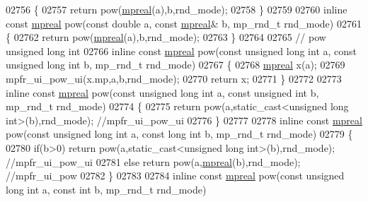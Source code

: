 \begin{DoxyCode}
{{02756 \{
02757     \textcolor{keywordflow}{return} pow(\hyperlink{classmpfr_1_1mpreal}{mpreal}(a),b,rnd\_mode);
02758 \}
02759 
02760 \textcolor{keyword}{inline} \textcolor{keyword}{const} \hyperlink{classmpfr_1_1mpreal}{mpreal} pow(\textcolor{keyword}{const} \textcolor{keywordtype}{double} a, \textcolor{keyword}{const} \hyperlink{classmpfr_1_1mpreal}{mpreal}& b, mp\_rnd\_t rnd\_mode)
02761 \{
02762     \textcolor{keywordflow}{return} pow(\hyperlink{classmpfr_1_1mpreal}{mpreal}(a),b,rnd\_mode);
02763 \}
02764 
02765 \textcolor{comment}{// pow unsigned long int}
02766 \textcolor{keyword}{inline} \textcolor{keyword}{const} \hyperlink{classmpfr_1_1mpreal}{mpreal} pow(\textcolor{keyword}{const} \textcolor{keywordtype}{unsigned} \textcolor{keywordtype}{long} \textcolor{keywordtype}{int} a, \textcolor{keyword}{const} \textcolor{keywordtype}{unsigned} \textcolor{keywordtype}{long} \textcolor{keywordtype}{int} b, mp\_rnd\_t rnd\_mode)
02767 \{
02768     \hyperlink{classmpfr_1_1mpreal}{mpreal} x(a);
02769     mpfr\_ui\_pow\_ui(x.mp,a,b,rnd\_mode);
02770     \textcolor{keywordflow}{return} x;
02771 \}
02772 
02773 \textcolor{keyword}{inline} \textcolor{keyword}{const} \hyperlink{classmpfr_1_1mpreal}{mpreal} pow(\textcolor{keyword}{const} \textcolor{keywordtype}{unsigned} \textcolor{keywordtype}{long} \textcolor{keywordtype}{int} a, \textcolor{keyword}{const} \textcolor{keywordtype}{unsigned} \textcolor{keywordtype}{int} b, mp\_rnd\_t rnd\_mode)
02774 \{
02775     \textcolor{keywordflow}{return} pow(a,static\_cast<unsigned long int>(b),rnd\_mode); \textcolor{comment}{//mpfr\_ui\_pow\_ui}
02776 \}
02777 
02778 \textcolor{keyword}{inline} \textcolor{keyword}{const} \hyperlink{classmpfr_1_1mpreal}{mpreal} pow(\textcolor{keyword}{const} \textcolor{keywordtype}{unsigned} \textcolor{keywordtype}{long} \textcolor{keywordtype}{int} a, \textcolor{keyword}{const} \textcolor{keywordtype}{long} \textcolor{keywordtype}{int} b, mp\_rnd\_t rnd\_mode)
02779 \{
02780     \textcolor{keywordflow}{if}(b>0)    \textcolor{keywordflow}{return} pow(a,static\_cast<unsigned long int>(b),rnd\_mode); \textcolor{comment}{//mpfr\_ui\_pow\_ui}
02781     \textcolor{keywordflow}{else}       \textcolor{keywordflow}{return} pow(a,\hyperlink{classmpfr_1_1mpreal}{mpreal}(b),rnd\_mode); \textcolor{comment}{//mpfr\_ui\_pow}
02782 \}
02783 
02784 \textcolor{keyword}{inline} \textcolor{keyword}{const} \hyperlink{classmpfr_1_1mpreal}{mpreal} pow(\textcolor{keyword}{const} \textcolor{keywordtype}{unsigned} \textcolor{keywordtype}{long} \textcolor{keywordtype}{int} a, \textcolor{keyword}{const} \textcolor{keywordtype}{int} b, mp\_rnd\_t rnd\_mode)
}}
\end{DoxyCode}
